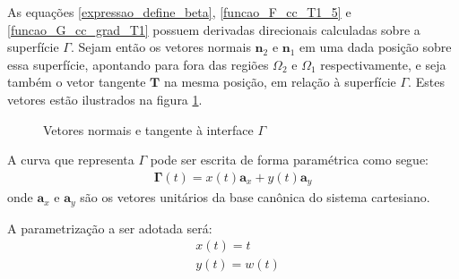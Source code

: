 As equações \eqref{expressao_define_beta}, \eqref{funcao_F_cc_T1_5} e \eqref{funcao_G_cc_grad_T1} possuem derivadas direcionais calculadas sobre a superfície $\Gamma$.
Sejam então os vetores normais $\mathbf{n}_2$ e $\mathbf{n}_1$ em uma dada posição sobre essa superfície, apontando para fora das regiões $\Omega_2$ e $\Omega_1$ respectivamente, e
seja também o vetor tangente $\mathbf{T}$ na mesma posição, em relação à superfície $\Gamma$. Estes vetores estão ilustrados na figura \ref{fig7}.
\begin{figure}[h!b]
\begin{center}
\caption{Vetores normais e tangente à interface $\Gamma$}
\label{fig7}
\end{center}
\end{figure}

A curva que representa $\Gamma$ pode ser escrita de forma paramétrica como segue:
\begin{align}
	\mathbf{\Gamma}(t) = x(t) \mathbf{a}_x + y(t) \mathbf{a}_y \label{forma_parametrica}
\end{align}
onde $\mathbf{a}_x$ e $\mathbf{a}_y$ são os vetores unitários da base canônica do sistema cartesiano.

A parametrização a ser adotada será:
\begin{align}
	& x(t) = t \label{parametrizacao_x}\\
	& y(t) = w(t) \label{parametrizacao_y}
\end{align}

